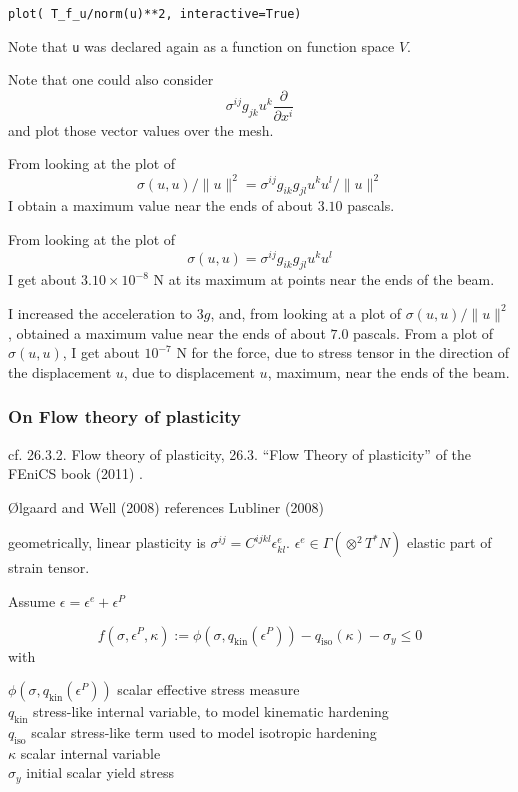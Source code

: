 \documentclass[twoside,landscape,10pt]{amsart}
\theoremstyle{plain}
\theoremstyle{definition}
\theoremstyle{remark}
\begin{document}
\begin{multicols*}{2}
\begin{lstlisting}
plot( T_f_u/norm(u)**2, interactive=True)
\end{lstlisting}
Note that \verb|u| was declared again as a function on function space $V$.  

Note that one could also consider 
\[
\sigma^{ij}g_{jk}u^k \frac{ \partial }{ \partial x^i}
\]
and plot those vector values over the mesh.  

From looking at the plot of 
\[
\sigma(u,u)/ \|u\|^2 = \sigma^{ij} g_{ik} g_{jl} u^k u^l / \| u \|^2
\]
I obtain a maximum value near the ends of about $3.10$ pascals.  

From looking at the plot of 
\[
\sigma(u,u) = \sigma^{ij} g_{ik} g_{jl} u^k u^l 
\]
I get about $3.10 \times 10^{-8}$ N at its maximum at points near the ends of the beam.  

I increased the acceleration to $3g$, and, from looking at a plot of $\sigma(u,u)/\|u\|^2$, obtained a maximum value near the ends of about $7.0$ pascals.  From a plot of $\sigma(u,u)$, I get about $10^{-7}$ N for the force, due to stress tensor in the direction of the displacement $u$, due to displacement $u$, maximum, near the ends of the beam.  



\subsubsection{On Flow theory of plasticity}

cf. 26.3.2. Flow theory of plasticity, 26.3. ``Flow Theory of plasticity'' of the FEniCS book (2011) \cite{FEniCS}.  

\O lgaard and Well (2008) references Lubliner (2008)

geometrically, linear plasticity is $\sigma^{ij} = C^{ijkl} \epsilon^e_{kl}$.  $\epsilon^e \in \Gamma(\otimes^2 T^*N)$ elastic part of strain tensor.  

Assume $\epsilon = \epsilon^e + \epsilon^P$

\[
f(\sigma, \epsilon^P, \kappa) := \phi(\sigma, q_{\text{kin}}(\epsilon^P)) - q_{\text{iso}}(\kappa) - \sigma_y \leq 0
\]
with

$\phi(\sigma,q_{\text{kin}}(\epsilon^P))$ scalar effective stress measure \\
$q_{\text{kin}}$ stress-like internal variable, to model kinematic hardening \\
$q_{\text{iso}}$ scalar stress-like term used to model isotropic hardening \\
$\kappa$ scalar internal variable \\
$\sigma_y$ initial scalar yield stress 


\end{multicols*}
\end{document}
